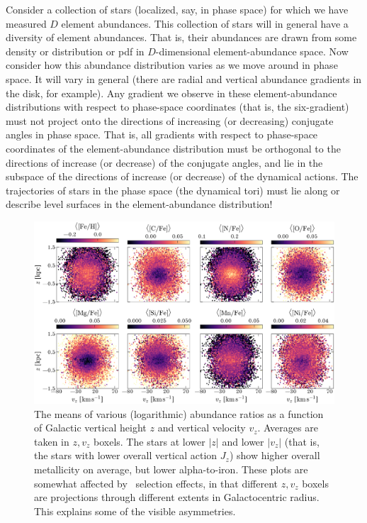 \documentclass[modern]{aastex63}
\newcommand{\apogee}{\acronym{APOGEE}}
\begin{document}
Consider a collection of stars (localized, say, in phase space) for which we have
measured $D$ element abundances.
This collection of stars will in general have a diversity of element abundances.
That is, their abundances are drawn from some density or distribution or pdf in
$D$-dimensional element-abundance space.
Now consider how this abundance distribution varies as we move around in phase space.
It will vary in general (there are radial and vertical abundance gradients in the
disk, for example).
Any gradient we observe in these element-abundance distributions with respect to
phase-space coordinates (that is, the six-gradient) must not project
onto the directions of increasing (or decreasing) conjugate angles in phase space.
That is, all gradients with respect to phase-space coordinates
of the element-abundance distribution must be orthogonal to the
directions of increase (or decrease) of the conjugate angles, and lie in the subspace
of the directions of increase (or decrease) of the dynamical actions.
The trajectories of stars in the phase space (the dynamical tori) must lie along or
describe level surfaces in the element-abundance distribution!

\begin{figure}[!tp]
  \begin{center}
  \includegraphics[width=\textwidth]{abundance-zvz-grid.pdf}
  \end{center}
  \caption{%
    The means of various (logarithmic) abundance ratios as a function of
    Galactic vertical height $z$ and vertical velocity $v_z$.
    Averages are taken in $z, v_z$ boxels.
    The stars at lower $|z|$ and lower $|v_z|$ (that is, the stars with
    lower overall vertical action $J_z$) show higher overall metallicity
    on average, but lower alpha-to-iron.
    These plots are somewhat affected by \apogee\ selection effects, in
    that different $z, v_z$ boxels are projections through different extents
    in Galactocentric radius. This explains some of the visible asymmetries.
  \label{fig:zvz-grid}
  }
\end{figure}
\end{document}
